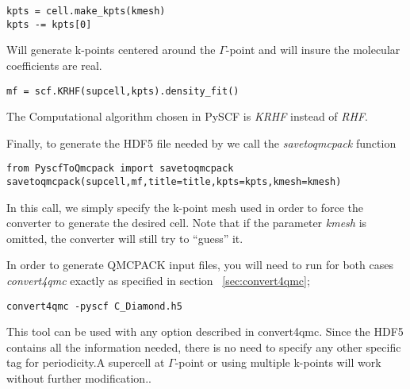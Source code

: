 \begin{lstlisting}
kpts = cell.make_kpts(kmesh)
kpts -= kpts[0]
\end{lstlisting}
Will generate k-points centered around the $\Gamma$-point and will insure the molecular coefficients are real.\\

\begin{lstlisting}
mf = scf.KRHF(supcell,kpts).density_fit()
\end{lstlisting}
The Computational algorithm chosen in PySCF is \textit{KRHF} instead of \textit{RHF}.

Finally, to generate the HDF5 file needed by \qmcpack we call the \textit{savetoqmcpack} function\\
\begin{lstlisting}
from PyscfToQmcpack import savetoqmcpack
savetoqmcpack(supcell,mf,title=title,kpts=kpts,kmesh=kmesh)
\end{lstlisting}
In this call, we simply specify the k-point mesh used in order to force the converter to generate the desired cell. Note that if the parameter \textit{kmesh} is omitted, the converter will still try to ``guess'' it.



In order to generate QMCPACK input files, you will need to run for both cases \textit{convert4qmc} exactly as specified in section ~\ref{sec:convert4qmc};
\begin{lstlisting}
convert4qmc -pyscf C_Diamond.h5
\end{lstlisting}

This tool can be used with any option described in convert4qmc. Since
the HDF5 contains all the information needed, there is no need to
specify any other specific tag for periodicity.A supercell at
$\Gamma$-point or using multiple k-points will work without further
modification..

